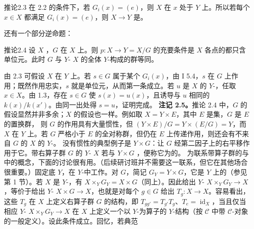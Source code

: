 \begin{SGAresult}{推论}{2.3}
在 2.2 的条件下，若 $G_i(x)=(e)$，则 $X$ 在 $x$ 处于 $Y$ 上。所以若每个 $x\in X$ 都满足 $G_i(x)=(e)$，则 $X\to Y$ 是。
\end{SGAresult}
还有一个部分逆命题：
\begin{SGAresult}{推论}{2.4}
设 $X$ ，$G$ 在 $X$ 上。则 $p:X\to Y=X/G$ 的充要条件是 $X$ 各点的都只含单位元。此时 $G$ 与 $Y$- $X$ 的全体 $Y$-构成的群等同。
\end{SGAresult}
由 2.3 可假设 $X$ 在 $Y$ 上。若 $s\in G$ 属于某个 $G_i(x)$，由 I 5.4，$s$ 在 $G$ 上作用；既然作用忠实，$s$ 就是单位元，从而第一条成立。若 $u$ 是 $X$ 的 $Y$-，任取 $x\in X$。由 1.3，存在 $s\in G$ 使 $s(x)=u(x)$，且诱导与 $u$ 相同的 $k(x)/k(x')$。由同一出处得 $s=u$，证明完成。
\textbf{注记 2.5。}推论 2.4 中，$G$ 的假设显然并非多余；$X$ 的假设也一样。例如取 $X=Y\times E$，其中 $E$ 是集，$G$ 是 $E$ 的置换群，
则 $G$ 的作用具有大量惯性，但 $(Y\times E)/G=Y\times(E/G)=Y$，而 $X$ 在 $Y$ 上。若 $G$ 严格小于 $E$ 的全对称群，但仍在 $E$ 上传递作用，则还会有不来自 $G$ 的 $X$ 的 $Y$-。
没有惯性的典型例子是 $Y\times G$：让 $G$ 经第二因子上的右平移作用于它。带右算子群 $G$ 的 $Y$- $X$ 若与 $Y\times G$ ，便称它为的。
为联系带算子群的与中的概念，下面的讨论很有用。（后续研讨班并不需要这一联系，但它在其他场合很重要。）固定底 $Y$，在 $Y$-中工作。对 $G$，简记 $G_Y=Y\times G$，它是 $Y$ 上的（参见第 1 节）。若 $X$ 是 $Y$-，有 $X\times_YG_Y=X\times G$（同上）。因此给出 $Y$- $X\times_YG_Y\to X$，等价于给出 $Y$- $X\times G\to X$，也就是对每个 $g\in G$ 给出 $T_g:X\to X$。容易看出，这些 $T_g$ 在 $X$ 上定义右算子群 $G$ 的结构，即 $T_{gg'}=T_{g'}T_g$、$T_e=\operatorname{id}_X$，当且仅当相应 $Y$- $X\times_YG_Y\to X$ 在 $X$ 上定义一个以 $Y$-为算子的 $Y$-结构（按 $\mathcal C$ 中带 $\mathcal C$-对象的一般定义）。设此条件成立。回忆，若典范
